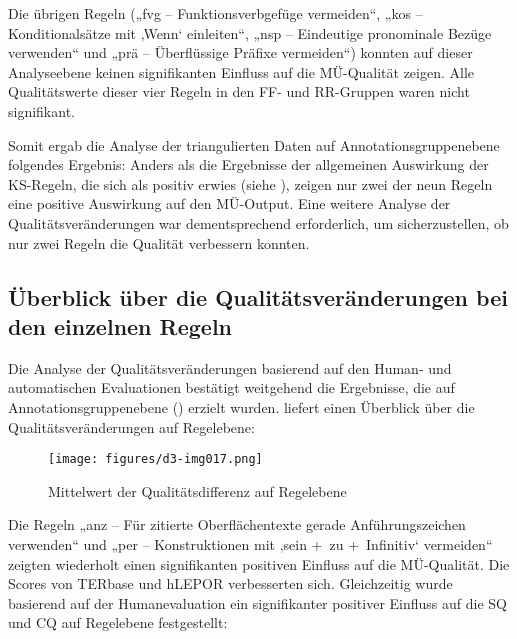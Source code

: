 Die übrigen Regeln („fvg -- Funktionsverbgefüge vermeiden“, „kos -- Konditionalsätze mit ‚Wenn‘ einleiten“, „nsp -- Eindeutige pronominale Bezüge verwenden“ und „prä -- Überflüssige Präfixe vermeiden“) konnten auf dieser Analyseebene keinen signifikanten Einfluss auf die MÜ-Qualität zeigen. Alle Qualitätswerte dieser vier Regeln in den FF- und RR-Gruppen waren nicht signifikant.

Somit ergab die Analyse der triangulierten Daten auf Annotationsgruppenebene folgendes Ergebnis: Anders als die Ergebnisse der allgemeinen Auswirkung der KS-Regeln, die sich als positiv erwies (siehe ), zeigen nur zwei der neun Regeln eine positive Auswirkung auf den MÜ-Output. Eine weitere Analyse der Qualitätsveränderungen war dementsprechend erforderlich, um sicherzustellen, ob nur zwei Regeln die Qualität verbessern konnten.

\subsection{Überblick über die Qualitätsveränderungen bei den einzelnen Regeln}

Die Analyse der Qualitätsveränderungen basierend auf den Human- und automatischen Evaluationen bestätigt weitgehend die Ergebnisse, die auf Annotationsgruppenebene () erzielt wurden.  liefert einen Überblick über die Qualitätsveränderungen auf Regelebene:


\begin{figure}

\texttt{[image: figures/d3-img017.png]}

\caption{\label{fig:06:151} Mittelwert der Qualitätsdifferenz auf Regelebene}
\end{figure}

Die Regeln „anz -- Für zitierte Oberflächentexte gerade Anführungszeichen verwenden“ und „per -- Konstruktionen mit ‚sein +~zu +~Infinitiv‘ vermeiden“ zeigten wiederholt einen signifikanten positiven Einfluss auf die MÜ-Qualität. Die Scores von TERbase und hLEPOR verbesserten sich. Gleichzeitig wurde basierend auf der Humanevaluation ein signifikanter positiver Einfluss auf die SQ und CQ auf Regelebene festgestellt:

